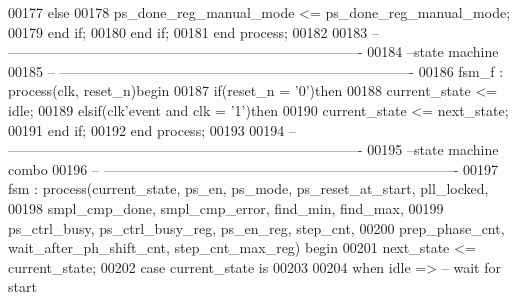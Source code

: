 \begin{DoxyCode}
00177          \textcolor{keywordflow}{else}
00178             \textcolor{vhdlchar}{ps_done_reg_manual_mode} \textcolor{vhdlchar}{<=} \textcolor{vhdlchar}{ps_done_reg_manual_mode};
00179          \textcolor{keywordflow}{end} \textcolor{keywordflow}{if};
00180       \textcolor{keywordflow}{end} \textcolor{keywordflow}{if};
00181    \textcolor{keywordflow}{end} \textcolor{keywordflow}{process};
00182    
00183 \textcolor{keyword}{-- ----------------------------------------------------------------------------}
00184 \textcolor{keyword}{--state machine}
00185 \textcolor{keyword}{-- ----------------------------------------------------------------------------}
00186 fsm\_f : \textcolor{keywordflow}{process}(clk, reset_n)\textcolor{keywordflow}{begin}
00187    \textcolor{keywordflow}{if}\textcolor{vhdlchar}{(}\textcolor{vhdlchar}{reset_n} \textcolor{vhdlchar}{=} \textcolor{vhdlchar}{'}\textcolor{vhdllogic}{}\textcolor{vhdllogic}{0}\textcolor{vhdlchar}{'}\textcolor{vhdlchar}{)}\textcolor{keywordflow}{then}
00188       \textcolor{vhdlchar}{current_state}  \textcolor{vhdlchar}{<=} \textcolor{vhdlchar}{idle};
00189    \textcolor{keywordflow}{elsif}\textcolor{vhdlchar}{(}\textcolor{vhdlchar}{clk}\textcolor{vhdlchar}{'}\textcolor{vhdlkeyword}{event} \textcolor{keywordflow}{and} \textcolor{vhdlchar}{clk} \textcolor{vhdlchar}{=} \textcolor{vhdlchar}{'}\textcolor{vhdllogic}{}\textcolor{vhdllogic}{1}\textcolor{vhdlchar}{'}\textcolor{vhdlchar}{)}\textcolor{keywordflow}{then} 
00190       \textcolor{vhdlchar}{current_state} \textcolor{vhdlchar}{<=} \textcolor{vhdlchar}{next_state};
00191    \textcolor{keywordflow}{end} \textcolor{keywordflow}{if};  
00192 \textcolor{keywordflow}{end} \textcolor{keywordflow}{process};
00193 
00194 \textcolor{keyword}{-- ----------------------------------------------------------------------------}
00195 \textcolor{keyword}{--state machine combo}
00196 \textcolor{keyword}{-- ----------------------------------------------------------------------------}
00197 fsm : \textcolor{keywordflow}{process}(current_state, ps_en, ps_mode, ps_reset_at_start, pll_locked, 
00198                smpl_cmp_done, smpl_cmp_error, find_min, find_max, 
00199                ps_ctrl_busy, ps_ctrl_busy_reg, ps_en_reg, step_cnt, 
00200                prep_phase_cnt, wait_after_ph_shift_cnt, step_cnt_max_reg) \textcolor{keywordflow}{begin}
00201    \textcolor{vhdlchar}{next_state} \textcolor{vhdlchar}{<=} \textcolor{vhdlchar}{current_state};
00202    \textcolor{keywordflow}{case} \textcolor{vhdlchar}{current_state} \textcolor{keywordflow}{is}
00203    
00204       \textcolor{keywordflow}{when} \textcolor{vhdlchar}{idle} \textcolor{vhdlchar}{=}\textcolor{vhdlchar}{>}\textcolor{keyword}{                     -- wait for start}

\end{DoxyCode}
